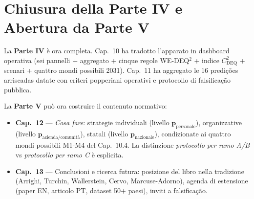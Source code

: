 \section{Chiusura della Parte IV e Abertura da Parte
V}\label{chiusura-della-parte-iv-e-apertura-della-parte-v}

La \textbf{Parte IV} è ora completa. Cap.~10 ha tradotto l'apparato in
dashboard operativa (sei pannelli + aggregato + cinque regole WE-DEQ$^2$ +
indice \(C_{\text{DEQ}}^2\) + scenari + quattro mondi possibili 2031).
Cap.~11 ha aggregato le 16 predições arriscadas datate con criteri
popperiani operativi e protocollo di falsificação pubblica.

La \textbf{Parte V} può ora costruire il contenuto normativo:

\begin{itemize}
\tightlist
\item
  \textbf{Cap.~12} --- \emph{Cosa fare}: strategie individuali (livello
  \(\boldsymbol{p}_{\text{personale}}\)), organizzative (livello
  \(\boldsymbol{p}_{\text{azienda/comunità}}\)), statali (livello
  \(\boldsymbol{p}_{\text{nazionale}}\)), condizionate ai quattro mondi
  possibili M1-M4 del Cap.~10.4. La distinzione \emph{protocollo per
  ramo A/B} vs \emph{protocollo per ramo C} è esplicita.
\item
  \textbf{Cap.~13} --- Conclusioni e ricerca futura: posizione del libro
  nella tradizione (Arrighi, Turchin, Wallerstein, Cervo,
  Marcuse-Adorno), agenda di estensione (paper EN, articolo PT, dataset
  50+ paesi), inviti a falsificação.
\end{itemize}


